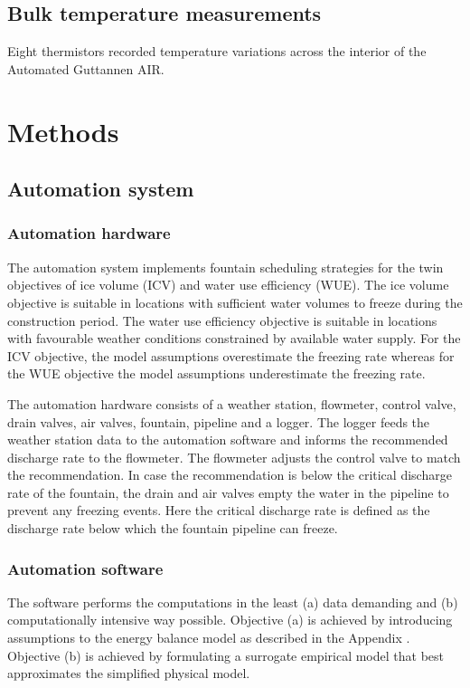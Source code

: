 \documentclass[tc, manuscript]{copernicus}
\begin{document}
\subsection{Bulk temperature measurements}

Eight thermistors recorded temperature variations across the interior of the Automated Guttannen AIR. 

\section{Methods}

\subsection{Automation system}

\subsubsection{Automation hardware}

The automation system implements fountain scheduling strategies for the twin objectives of ice volume (ICV) and
water use efficiency (WUE). The ice volume objective is suitable in locations with sufficient water volumes to
freeze during the construction period. The water use efficiency objective is suitable in locations with
favourable weather conditions constrained by available water supply. For the ICV objective, the model
assumptions overestimate the freezing rate whereas for the WUE objective the model assumptions underestimate the
freezing rate. 

The automation hardware consists of a weather station, flowmeter, control valve, drain valves, air valves,
fountain, pipeline and a logger. The logger feeds the weather station data to the automation software and
informs the recommended discharge rate to the flowmeter. The flowmeter adjusts the control valve to match the
recommendation. In case the recommendation is below the critical discharge rate of the fountain, the drain and
air valves empty the water in the pipeline to prevent any freezing events. Here the critical discharge rate is
defined as the discharge rate below which the fountain pipeline can freeze.

\subsubsection{Automation software}

The software performs the computations in the least (a) data demanding and (b) computationally intensive way
possible. Objective (a) is achieved by introducing assumptions to the energy balance model as described in the
Appendix . Objective (b) is achieved by formulating a surrogate empirical model that best approximates the
simplified physical model. 
\end{document}
